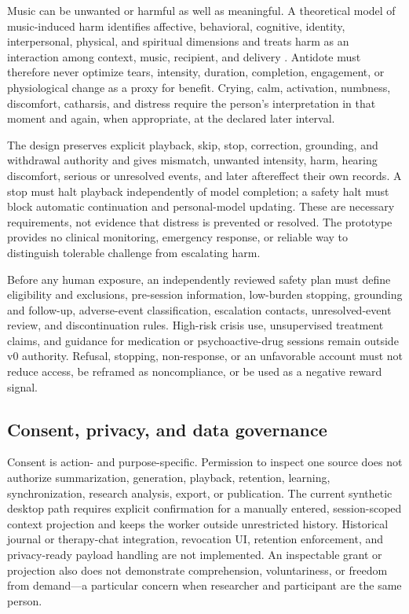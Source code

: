 Music can be unwanted or harmful as well as meaningful. A theoretical model of
music-induced harm identifies affective, behavioral, cognitive, identity,
interpersonal, physical, and spiritual dimensions and treats harm as an
interaction among context, music, recipient, and delivery
\citep{silverman2020complicated}. Antidote must therefore never optimize tears,
intensity, duration, completion, engagement, or physiological change as a proxy
for benefit. Crying, calm, activation, numbness, discomfort, catharsis, and
distress require the person's interpretation in that moment and again, when
appropriate, at the declared later interval.

The design preserves explicit playback, skip, stop, correction, grounding, and
withdrawal authority and gives mismatch, unwanted intensity, harm, hearing
discomfort, serious or unresolved events, and later aftereffect their own
records. A stop must halt playback independently of model completion; a safety
halt must block automatic continuation and personal-model updating. These are
necessary requirements, not evidence that distress is prevented or resolved.
The prototype provides no clinical monitoring, emergency response, or reliable
way to distinguish tolerable challenge from escalating harm.

Before any human exposure, an independently reviewed safety plan must define
eligibility and exclusions, pre-session information, low-burden stopping,
grounding and follow-up, adverse-event classification, escalation contacts,
unresolved-event review, and discontinuation rules. High-risk crisis use,
unsupervised treatment claims, and guidance for medication or psychoactive-drug
sessions remain outside v0 authority. Refusal, stopping, non-response, or an
unfavorable account must not reduce access, be reframed as noncompliance, or be
used as a negative reward signal.

\subsection{Consent, privacy, and data governance}
\label{sec:ethics-consent-privacy}

Consent is action- and purpose-specific. Permission to inspect one source does
not authorize summarization, generation, playback, retention, learning,
synchronization, research analysis, export, or publication. The current
synthetic desktop path requires explicit confirmation for a manually entered,
session-scoped context projection and keeps the worker outside unrestricted
history. Historical journal or therapy-chat integration, revocation UI,
retention enforcement, and privacy-ready payload handling are not implemented.
An inspectable grant or projection also does not demonstrate comprehension,
voluntariness, or freedom from demand---a particular concern when researcher
and participant are the same person.

